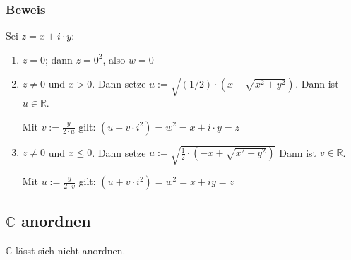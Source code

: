 \subsubsection{Beweis}
Sei $z = x + i \cdot y$:
\begin{enumerate}
\item{$z = 0$; dann $z = 0^2$, also $w = 0$}
\item{$z \neq 0$ und $x > 0$. Dann setze $u := \sqrt{(1/2) \cdot (x + \sqrt{x^2 + y^2})}$. Dann ist $u \in \mathbb{R}$.

Mit $v := \frac{y}{2 \cdot u}$ gilt: $(u + v \cdot i^2) = w^2 = x + i \cdot y = z$}
\item{$z \neq 0$ und $x \leq 0$. Dann setze $u := \sqrt{\frac{1}{2} \cdot (-x + \sqrt{x^2 + y^2})}$ Dann ist $v \in \mathbb{R}$.

Mit $u := \frac{y}{2 \cdot v}$ gilt: $(u + v \cdot i^2) = w^2 = x + iy = z$}

\end{enumerate}

\subsection{$\mathbb{C}$ anordnen}
$\mathbb{C}$ lässt sich nicht anordnen.
